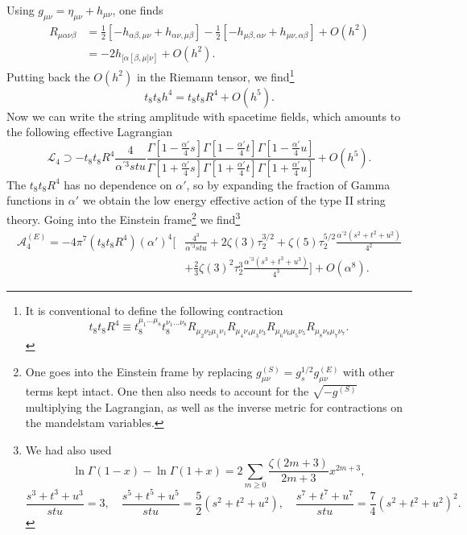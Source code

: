 Using $g_{\mu\nu} = \eta_{\mu\nu}+h_{\mu\nu}$, one finds
\begin{equation}
\begin{aligned}
R_{\mu\alpha\nu\beta}
&=\frac{1}{2}[-h_{\alpha\beta,\mu\nu}+h_{\alpha\nu,\mu\beta}]
-\frac{1}{2}[-h_{\mu\beta,\alpha\nu}+h_{\mu\nu,\alpha\beta}]
+ O(h^2)\\
&=-2h_{\big[\alpha[\beta,\mu \big]\nu]}  + O(h^2).
\end{aligned}
\end{equation}
Putting back the $O(h^2)$ in the Riemann tensor, we find\footnote{
It is conventional to define the following contraction
\begin{equation}
t_8t_8 R^4\equiv
t_8^{\mu_1...\mu_8}t_8^{\nu_1...\nu_8}
R_{\mu_2\nu_2\mu_1\nu_1}
R_{\mu_4\nu_4\mu_3\nu_3}
R_{\mu_6\nu_6\mu_5\nu_5}
R_{\mu_8\nu_8\mu_7\nu_7}.
\end{equation}
}
\begin{equation}
t_8t_8h^4=t_8t_8R^4 + O(h^5).
\end{equation}
Now we can write the string amplitude with spacetime fields, which amounts to the following effective Lagrangian
\begin{equation}
\mathcal L_4\supset
-t_8t_8 R^4\frac{4}{\alpha^{\prime 3}stu}
\frac{\Gamma[1-\tfrac{\alpha'}{4}s]\Gamma[1-\tfrac{\alpha'}{4}t]\Gamma[1-\tfrac{\alpha\prime}{4}u]}{\Gamma[1+\tfrac{\alpha'}{4}s]\Gamma[1+\tfrac{\alpha'}{4}t]\Gamma[1+\tfrac{\alpha'}{4}u]}
+O(h^5).
\end{equation}
The $t_8t_8R^4$ has no dependence on $\alpha'$, so by expanding the fraction of Gamma functions in $\alpha'$ we obtain the low energy effective action of the type II string theory.
Going into the Einstein frame\footnote{
One goes into the Einstein frame by replacing $g^{(S)}_{\mu\nu}=g_s^{1/2}g^{(E)}_{\mu\nu}$ with other terms kept intact. 
One then also needs to account for the $\sqrt{-g^{(S)}}$ multiplying the Lagrangian, as well as the inverse metric for contractions on the mandelstam variables.
}
we find\footnote{
We had also used
\begin{equation}
\ln\Gamma(1-x)-\ln\Gamma(1+x) = 2\sum_{m\ge0}\frac{\zeta(2m+3)}{2m+3}x^{2m+3},
\end{equation}
\begin{equation}
\frac{s^3+t^3+u^3}{stu}=3,\quad
\frac{s^5+t^5+u^5}{stu}=\frac{5}{2}(s^2+t^2+u^2),\quad
\frac{s^7+t^7+u^7}{stu}=\frac{7}{4}(s^2+t^2+u^2)^2.
\end{equation}
} \cite{Green:1999pv}
\begin{equation}
\begin{aligned}
\mathcal{A}^{(E)}_4
=-4\pi^7(t_8t_8R^4)(\alpha')^4
\Bigg[&\frac{4^3}{\alpha^{\prime 3}stu}+2\zeta(3)\tau_2^{3/2}+
\zeta(5)\tau_2^{5/2}\frac{\alpha^{\prime 2}(s^2+t^2+u^2)}{4^2}\\
&+\frac{2}{3}\zeta(3)^2\tau_2^3\frac{\alpha^{\prime 3}(s^3+t^3+u^3)}{4^3}
\Bigg] +O(\alpha^8).
\end{aligned}
\end{equation}
